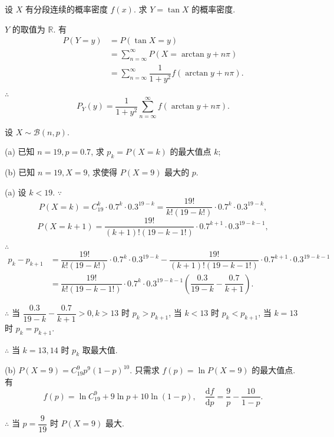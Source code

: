 \documentclass{ctexart}
\begin{document}
\addtocounter{exercise}{2}
\begin{exercise}[c]%
    设 $X$ 有分段连续的概率密度 $f(x)$. 求 $Y=\tan X$ 的概率密度.
\end{exercise}
\begin{solution}
    $Y$ 的取值为 $\mathbb{R}$. 有
    \begin{align*}
        P(Y=y) & =P(\tan X=y) \\
        & =\sum\limits_{n=\infty}^\infty P(X=\arctan y+n\pi) \\
        & =\sum\limits_{n=\infty}^\infty\dfrac{1}{1+y^2}f(\arctan y+n\pi).
    \end{align*}

    $\therefore$
    \[P_Y(y)=\dfrac{1}{1+y^2}\sum\limits_{n=\infty}^\infty f(\arctan y+n\pi).\]
\end{solution}
\begin{exercise}%
    设 $X\sim\mathcal{B}(n,p)$.

    (a) 已知 $n=19,p=0.7$, 求 $p_k=P(X=k)$ 的最大值点 $k$;

    (b) 已知 $n=19,X=9$, 求使得 $P(X=9)$ 最大的 $p$.
\end{exercise}
\begin{solution}
    (a) 设 $k<19$. $\because$
    \[P(X=k)=C_{19}^k\cdot0.7^k\cdot0.3^{19-k}=\dfrac{19!}{k!(19-k!)}\cdot0.7^k\cdot0.3^{19-k},\]
    \[P(X=k+1)=\dfrac{19!}{(k+1)!(19-k-1!)}\cdot0.7^{k+1}\cdot0.3^{19-k-1},\]

    $\therefore$
    \begin{align*}
        p_k-p_{k+1} & =\dfrac{19!}{k!(19-k!)}\cdot0.7^k\cdot0.3^{19-k}-\dfrac{19!}{(k+1)!(19-k-1!)}\cdot0.7^{k+1}\cdot0.3^{19-k-1} \\
        & =\dfrac{19!}{k!(19-k-1!)}\cdot0.7^k\cdot0.3^{19-k-1}\left(\dfrac{0.3}{19-k}-\dfrac{0.7}{k+1}\right).
    \end{align*}

    $\therefore$ 当 $\dfrac{0.3}{19-k}-\dfrac{0.7}{k+1}>0,k>13$ 时 $p_k>p_{k+1}$, 当 $k<13$ 时 $p_k<p_{k+1}$, 当 $k=13$ 时 $p_k=p_{k+1}$.

    $\therefore$ 当 $k=13,14$ 时 $p_k$ 取最大值.

    (b) $P(X=9)=C_{19}^9p^9(1-p)^{10}$. 只需求 $f(p)=\ln P(X=9)$ 的最大值点. 有
    \[f(p)=\ln C_{19}^9+9\ln p+10\ln(1-p),\quad\dfrac{\mathrm{d}f}{\mathrm{d}p}=\dfrac{9}{p}-\dfrac{10}{1-p}.\]

    $\therefore$ 当 $p=\dfrac{9}{19}$ 时 $P(X=9)$ 最大.
\end{solution}
\end{document}
